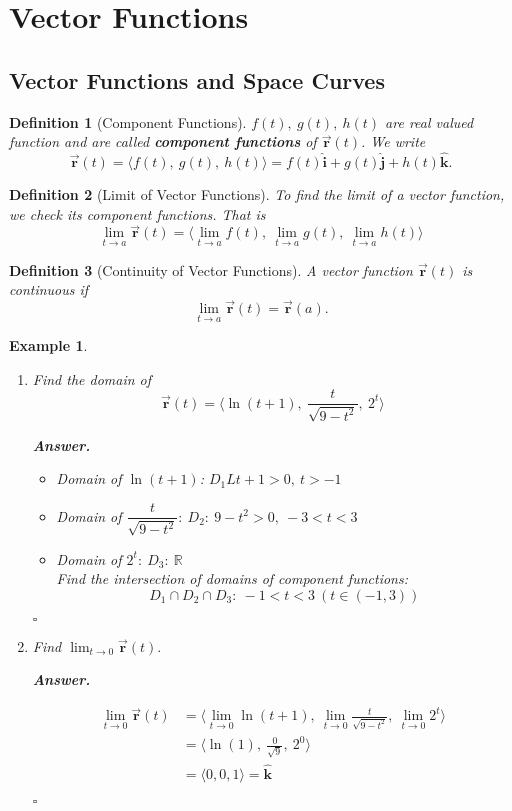 \documentclass[12pt,a4paper]{article}
\newtheorem{df}{Definition}[subsection]
\newtheorem{eg}{Example}[subsection]
\newenvironment*{ans}{\par\indent\textbf{\textit{Answer. }}\par}{\par\hfill{$\square$}\par}
\def\R{{\mathbb{R}}}
\def\vecr{\vec{\boldsymbol{\textbf{r}}}}
\def\veci{\hat{\boldsymbol{\textbf{i}}}}
\def\vecj{\hat{\boldsymbol{\textbf{j}}}}
\def\veck{\hat{\boldsymbol{\textbf{k}}}}
\begin{document}
\newpage
\section{Vector Functions}
\subsection{Vector Functions and Space Curves}
\begin{df}[Component Functions]
	$f(t),\ g(t),\ h(t)$ are real valued function and are called \textbf{component functions} of $\vecr(t)$. We write \[\vecr(t)=\langle f(t),\ g(t),\ h(t)\rangle=f(t)\veci+g(t)\vecj+h(t)\veck.\]		
\end{df}
\begin{df}[Limit of Vector Functions]
	To find the limit of a vector function, we check its component functions. That is \[\lim_{t\to a}\vecr(t)=\Big\langle\lim_{t\to a}f(t),\ \lim_{t\to a}g(t),\ \lim_{t\to a}h(t)\Big\rangle\]	
\end{df}
\begin{df}[Continuity of Vector Functions]
	A vector function $\vecr(t)$ is continuous if \[\lim_{t\to a}\vecr(t)=\vecr(a).\]	
\end{df}
\begin{eg}
	\begin{enumerate}
		\item Find the domain of \[\vecr(t)=\Big\langle\ln(t+1),\ \frac{t}{\sqrt{9-t^2}},\ 2^t\Big\rangle\]
		\begin{ans}
			\begin{itemize}
				\item Domain of $\ln(t+1)$: $D_1L t+1>0,\ t>-1$
				\item Domain of $\dfrac{t}{\sqrt{9-t^2}}:\ D_2:\ 9-t^2>0,\ -3<t<3$
				\item Domain of $2^t:\ D_3:\ \R$\\
				Find the intersection of domains of component functions: \[D_1\cap D_2\cap D_3:\ -1<t<3\ (t\in(-1,3))\]
			\end{itemize}	
		\end{ans}
		\item Find $\displaystyle\lim_{t\to0}\vecr(t).$
		\begin{ans}
			\[\begin{aligned}
			\lim_{t\to0}\vecr(t)&=\Big\langle\lim_{t\to0}\ln(t+1),\ \lim_{t\to0}\frac{t}{\sqrt{9-t^2}},\ \lim_{t\to0}2^t\Big\rangle\\
			&=\big\langle\ln(1),\ \frac{0}{\sqrt{9}},\ 2^0\big\rangle\\
			&=\langle0,0,1\rangle=\veck
			\end{aligned}\]
		\end{ans}
	\end{enumerate}	
\end{eg}
\end{document}

